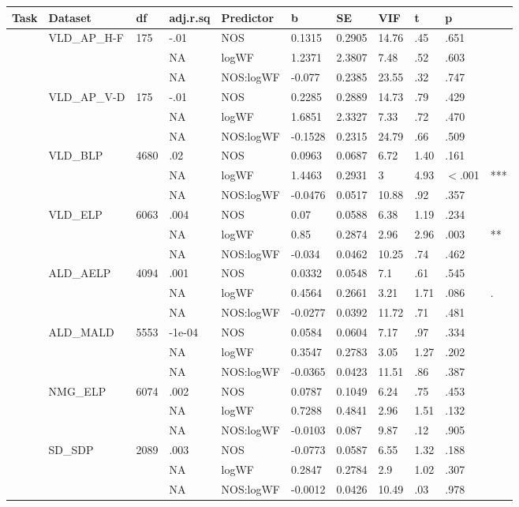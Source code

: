 \begin{table}[ht]
\centering
\begingroup\normalsize
\begin{tabular}{lllllllllll}
  \hline
Task & Dataset & df & adj.r.sq & Predictor & b & SE & VIF & t & p &  \\ 
  \hline
 & VLD\_AP\_H-F & 175 & -.01 & NOS & 0.1315 & 0.2905 & 14.76 & .45 & .651 &   \\ 
   &  &  & NA & logWF & 1.2371 & 2.3807 & 7.48 & .52 & .603 &   \\ 
   &  &  & NA & NOS:logWF & -0.077 & 0.2385 & 23.55 & .32 & .747 &   \\ 
   & VLD\_AP\_V-D & 175 & -.01 & NOS & 0.2285 & 0.2889 & 14.73 & .79 & .429 &   \\ 
   &  &  & NA & logWF & 1.6851 & 2.3327 & 7.33 & .72 & .470 &   \\ 
   &  &  & NA & NOS:logWF & -0.1528 & 0.2315 & 24.79 & .66 & .509 &   \\ 
   & VLD\_BLP & 4680 & .02 & NOS & 0.0963 & 0.0687 & 6.72 & 1.40 & .161 &   \\ 
   &  &  & NA & logWF & 1.4463 & 0.2931 & 3 & 4.93 & $<$.001 & *** \\ 
   &  &  & NA & NOS:logWF & -0.0476 & 0.0517 & 10.88 & .92 & .357 &   \\ 
   & VLD\_ELP & 6063 & .004 & NOS & 0.07 & 0.0588 & 6.38 & 1.19 & .234 &   \\ 
   &  &  & NA & logWF & 0.85 & 0.2874 & 2.96 & 2.96 & .003 & ** \\ 
   &  &  & NA & NOS:logWF & -0.034 & 0.0462 & 10.25 & .74 & .462 &   \\ 
   & ALD\_AELP & 4094 & .001 & NOS & 0.0332 & 0.0548 & 7.1 & .61 & .545 &   \\ 
   &  &  & NA & logWF & 0.4564 & 0.2661 & 3.21 & 1.71 & .086 & . \\ 
   &  &  & NA & NOS:logWF & -0.0277 & 0.0392 & 11.72 & .71 & .481 &   \\ 
   & ALD\_MALD & 5553 & -1e-04 & NOS & 0.0584 & 0.0604 & 7.17 & .97 & .334 &   \\ 
   &  &  & NA & logWF & 0.3547 & 0.2783 & 3.05 & 1.27 & .202 &   \\ 
   &  &  & NA & NOS:logWF & -0.0365 & 0.0423 & 11.51 & .86 & .387 &   \\ 
   & NMG\_ELP & 6074 & .002 & NOS & 0.0787 & 0.1049 & 6.24 & .75 & .453 &   \\ 
   &  &  & NA & logWF & 0.7288 & 0.4841 & 2.96 & 1.51 & .132 &   \\ 
   &  &  & NA & NOS:logWF & -0.0103 & 0.087 & 9.87 & .12 & .905 &   \\ 
   & SD\_SDP & 2089 & .003 & NOS & -0.0773 & 0.0587 & 6.55 & 1.32 & .188 &   \\ 
   &  &  & NA & logWF & 0.2847 & 0.2784 & 2.9 & 1.02 & .307 &   \\ 
   &  &  & NA & NOS:logWF & -0.0012 & 0.0426 & 10.49 & .03 & .978 &   \\ 
   \hline
\end{tabular}
\endgroup
\end{table}
